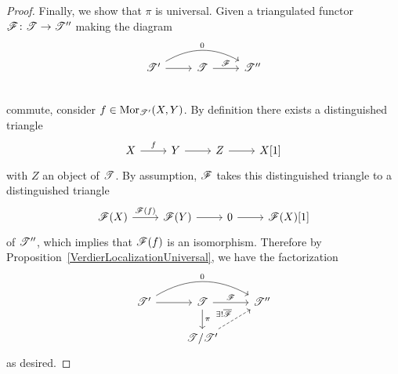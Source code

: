 \documentclass[dissertation.tex]{subfiles}
\begin{document}
\begin{thm}
\begin{proof}
    Finally, we show that $\pi$ is universal.
    Given a triangulated functor $\mathscr{F} \colon \mathscr{T} \to \mathscr{T}^{\prime\prime}$ making the diagram 
    $$\begin{tikzcd}
      \T^\prime \arrow{r}\arrow[bend left]{rr}{0} & \T \arrow{r}{\F} & \T^{\prime\prime}\\
    \end{tikzcd}$$
  commute, consider $f \in \operatorname{Mor}_{\mathscr{T}^\prime}(X,Y)$.
  By definition there exists a distinguished triangle
  $$\begin{tikzcd}
    X \arrow{r}{f} & Y \arrow{r} & Z \arrow{r} & X[1]
  \end{tikzcd}$$
  with $Z$ an object of $\mathscr{T}$.
  By assumption, $\mathscr{F}$ takes this distinguished triangle to a distinguished triangle
  $$\begin{tikzcd}
    \F(X) \arrow{r}{\F(f)} & \F(Y) \arrow{r} & 0 \arrow{r} & \F(X)[1]
  \end{tikzcd}$$
  of $\mathscr{T}^{\prime\prime}$, which implies that $\mathscr{F}(f)$ is an isomorphism.
  Therefore by Proposition~\ref{VerdierLocalizationUniversal}, we have the factorization
  $$\begin{tikzcd}
    \T^\prime \arrow{r}\arrow[bend left]{rr}{0} & \T \arrow{d}{\pi}\arrow{r}{\F} & \T^{\prime\prime}\\
    & \T/\T^\prime \arrow[dashed]{ur}{\exists !\overline{\F}}
  \end{tikzcd}$$
  as desired.
  \end{proof}
\end{thm}

\end{document}
